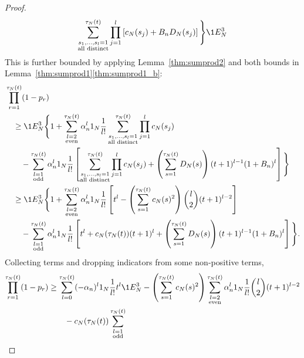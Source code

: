 \begin{proof}
\begin{align*}
        \sum_{\substack{ s_1, \dots, s_l =1 \\ \text{all distinct} }}^{\tau_N(t)}
        \prod_{j=1}^l
        \left[ c_N(s_j) + B_n D_N(s_j) \right] \Bigg\} \1{E_N^3}
\end{align*}
This is further bounded by applying Lemma~\ref{thm:sumprod2} and both bounds in Lemma~\ref{thm:sumprod1}\ref{thm:sumprod1_b}:
\begin{align*}
&\prod_{r=1}^{\tau_N(t)} (1-p_r) \\
&\quad\geq \1{E_N^3} \Bigg\{ 1 + 
        \sum_{\substack{l=2 \\ \text{even} }}^{\tau_N(t)} 
        \alpha_n^l \ON \frac{1}{l!} 
        \sum_{\substack{ s_1, \dots, s_l =1 \\ \text{all distinct} }}^{\tau_N(t)}
        \prod_{j=1}^l c_N(s_j) \\
    &\qquad- \sum_{\substack{l=1 \\ \text{odd} }}^{\tau_N(t)} 
        \alpha_n^l \ON \frac{1}{l!}
        \left[ \sum_{\substack{ s_1, \dots, s_l =1 \\ \text{all distinct} }}^{\tau_N(t)}
        \prod_{j=1}^l c_N(s_j)
        + \left( \sum_{s=1}^{\tau_N(t)} D_N(s) \right)
        (t+1)^{l-1} (1+B_n)^l \right] \Bigg\} \\
&\quad\geq \1{E_N^3} \Bigg\{ 1 + 
        \sum_{\substack{l=2 \\ \text{even} }}^{\tau_N(t)} 
        \alpha_n^l \ON \frac{1}{l!} 
        \left[ t^l - \left( \sum_{s=1}^{\tau_N(t)} c_N(s)^2 \right)
        \binom{l}{2}(t+1)^{l-2} \right] \\
    &\qquad- \sum_{\substack{l=1 \\ \text{odd} }}^{\tau_N(t)} 
        \alpha_n^l \ON \frac{1}{l!}
        \left[ t^l + c_N(\tau_N(t)) (t+1)^l
        + \left( \sum_{s=1}^{\tau_N(t)} D_N(s) \right)
        (t+1)^{l-1} (1+B_n)^l \right] \Bigg\} .
\end{align*}
Collecting terms and dropping indicators from some non-positive terms,
\begin{align}
\prod_{r=1}^{\tau_N(t)} (1-p_r)
&\geq \sum_{l=0}^{\tau_N(t)} (-\alpha_n)^l \ON 
        \frac{1}{l!} t^l \1{E_N^3}
        - \left( \sum_{s=1}^{\tau_N(t)} c_N(s)^2 \right)
        \sum_{\substack{l=2 \\ \text{even} }}^{\tau_N(t)} 
        \alpha_n^l \ON \frac{1}{l!} \binom{l}{2}(t+1)^{l-2} \notag\\
    &\qquad- c_N(\tau_N(t)) \sum_{\substack{l=1 \\ \text{odd} }}^{\tau_N(t)} 

\end{align}
\end{proof}
